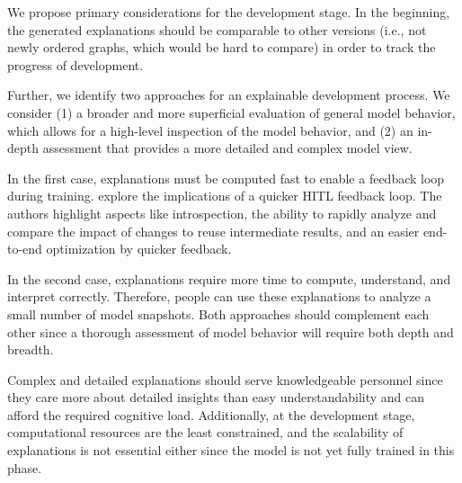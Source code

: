 \documentclass[twoside,11pt]{article}
\begin{document}

We propose primary considerations for the development stage. In the beginning, the generated explanations should be comparable to other versions (i.e., not newly ordered graphs, which would be hard to compare) in order to track the progress of development. 

Further, we identify two approaches for an explainable development process. We consider (1) a broader and more superficial evaluation of general model behavior, which allows for a high-level inspection of the model behavior, and (2) an in-depth assessment that provides a more detailed and complex model view.

In the first case, explanations must be computed fast to enable a feedback loop during training. \citet{XinEtAl:2018:HITLMLFeedbackLoop} explore the implications of a quicker HITL feedback loop. The authors highlight aspects like introspection, the ability to rapidly analyze and compare the impact of changes to reuse intermediate results, and an easier end-to-end optimization by quicker feedback.

In the second case, explanations require more time to compute, understand, and interpret correctly. Therefore, people can use these explanations to analyze a small number of model snapshots.
Both approaches should complement each other since a thorough assessment of model behavior will require both depth and breadth.


Complex and detailed explanations should serve knowledgeable personnel since they care more about detailed insights than easy understandability and can afford the required cognitive load. Additionally, at the development stage, computational resources are the least constrained, and the scalability of explanations is not essential either since the model is not yet fully trained in this phase.
\end{document}
